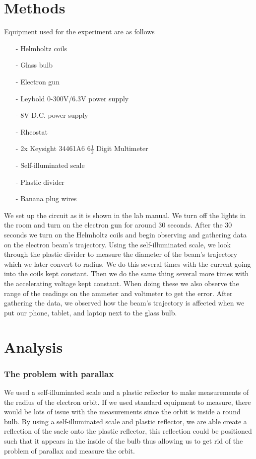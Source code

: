 \documentclass{article}
\begin{document}
\section{Methods}
Equipment used for the experiment are as follows
\begin{itemize}
    \item[-] Helmholtz coils
    \item[-] Glass bulb
    \item[-] Electron gun
    \item[-] Leybold 0-300V/6.3V power supply
    \item[-] 8V D.C. power supply
    \item[-] Rheostat
    \item[-] 2x Keysight 34461A6 6$\frac{1}{2}$ Digit Multimeter
    \item[-] Self-illuminated scale
    \item[-] Plastic divider
    \item[-] Banana plug wires
\end{itemize}
We set up the circuit as it is shown in the lab manual.  We turn off the lights
in the room and turn on the electron gun for around 30 seconds.  After the 30
seconds we turn on the Helmholtz coils and begin observing and gathering data on the
electron beam's trajectory.  Using the self-illuminated scale, we look through the 
plastic divider to measure the diameter of the beam's trajectory which we later 
convert to radius.  We do this several times with the current going into the coils 
kept constant.  Then we do the same thing several more times with the accelerating 
voltage kept constant.  When doing these we also observe the range 
of the readings on the ammeter and voltmeter to get the error.  After gathering the 
data, we observed how the beam's trajectory is affected when we put our phone, tablet, 
and laptop next to the glass bulb.

\section{Analysis}
\subsubsection*{The problem with parallax}
We used a self-illuminated scale and a plastic reflector to make measurements
of the radius of the electron orbit. If we used standard equipment to measure,
there would be lots of issue with the measurements since the orbit is inside a
round bulb. By using a self-illuminated scale and plastic reflector, we are able
create a reflection of the sacle onto the plastic reflector, this reflection
could be positioned such that it appears in the inside of the bulb thus allowing
us to get rid of the problem of parallax and measure the orbit.
\end{document}
